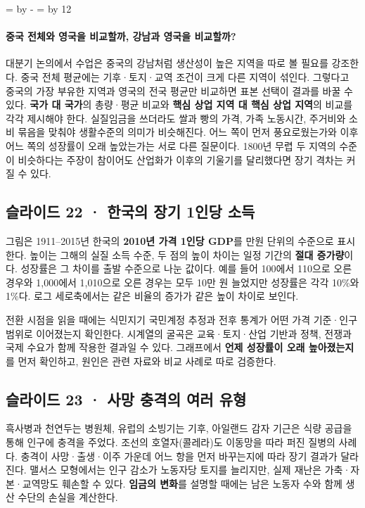 \documentclass[10pt,a4paper]{article}
\newcommand{\ReserveQuestionSpace}{%
  \par\begingroup
  \dimen0=\pagegoal \advance\dimen0 by -\pagetotal
  \dimen2=\baselineskip \multiply\dimen2 by 12
  \ifdim\dimen0<\dimen2 \newpage\fi
  \endgroup}
\begin{document}
\ReserveQuestionSpace
\paragraph{중국 전체와 영국을 비교할까, 강남과 영국을 비교할까?}

대분기 논의에서 수업은 중국의 강남처럼 생산성이 높은 지역을 따로 볼 필요를 강조한다. 중국 전체 평균에는 기후·토지·교역 조건이 크게 다른 지역이 섞인다. 그렇다고 중국의 가장 부유한 지역과 영국의 전국 평균만 비교하면 표본 선택이 결과를 바꿀 수 있다. \textbf{국가 대 국가}의 총량·평균 비교와 \textbf{핵심 상업 지역 대 핵심 상업 지역}의 비교를 각각 제시해야 한다. 실질임금을 쓰더라도 쌀과 빵의 가격, 가족 노동시간, 주거비와 소비 묶음을 맞춰야 생활수준의 의미가 비슷해진다. 어느 쪽이 먼저 풍요로웠는가와 이후 어느 쪽의 성장률이 오래 높았는가는 서로 다른 질문이다. 1800년 무렵 두 지역의 수준이 비슷하다는 주장이 참이어도 산업화가 이후의 기울기를 달리했다면 장기 격차는 커질 수 있다.\par

\subsection{슬라이드 22 · 한국의 장기 1인당 소득}
그림은 1911–2015년 한국의 \textbf{2010년 가격 1인당 GDP}를 만원 단위의 수준으로 표시한다. 높이는 그해의 실질 소득 수준, 두 점의 높이 차이는 일정 기간의 \textbf{절대 증가량}이다. 성장률은 그 차이를 출발 수준으로 나눈 값이다. 예를 들어 100에서 110으로 오른 경우와 1,000에서 1,010으로 오른 경우는 모두 10만 원 늘었지만 성장률은 각각 10\%와 1\%다. 로그 세로축에서는 같은 비율의 증가가 같은 높이 차이로 보인다.\par

전환 시점을 읽을 때에는 식민지기 국민계정 추정과 전후 통계가 어떤 가격 기준·인구 범위로 이어졌는지 확인한다. 시계열의 굴곡은 교육·토지·산업 기반과 정책, 전쟁과 국제 수요가 함께 작용한 결과일 수 있다. 그래프에서 \textbf{언제 성장률이 오래 높아졌는지}를 먼저 확인하고, 원인은 관련 자료와 비교 사례로 따로 검증한다.\par

\subsection{슬라이드 23 · 사망 충격의 여러 유형}
흑사병과 천연두는 병원체, 유럽의 소빙기는 기후, 아일랜드 감자 기근은 식량 공급을 통해 인구에 충격을 주었다. 조선의 호열자(콜레라)도 이동망을 따라 퍼진 질병의 사례다. 충격이 사망·출생·이주 가운데 어느 항을 먼저 바꾸는지에 따라 장기 결과가 달라진다. 맬서스 모형에서는 인구 감소가 노동자당 토지를 늘리지만, 실제 재난은 가축·자본·교역망도 훼손할 수 있다. \textbf{임금의 변화}를 설명할 때에는 남은 노동자 수와 함께 생산 수단의 손실을 계산한다.\par
\end{document}
